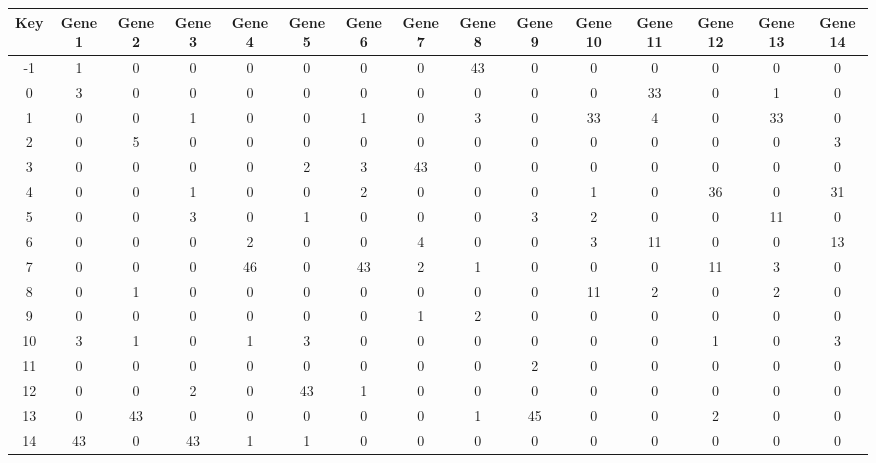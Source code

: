 \begin{tabular}{|c|c|c|c|c|c|c|c|c|c|c|c|c|c|c|}
\hline
Key & Gene 1 & Gene 2 & Gene 3 & Gene 4 & Gene 5 & Gene 6 & Gene 7 & Gene 8 & Gene 9 & Gene 10 & Gene 11 & Gene 12 & Gene 13 & Gene 14 \\
\hline
-1 & 1 & 0 & 0 & 0 & 0 & 0 & 0 & 43 & 0 & 0 & 0 & 0 & 0 & 0 \\
0 & 3 & 0 & 0 & 0 & 0 & 0 & 0 & 0 & 0 & 0 & 33 & 0 & 1 & 0 \\
1 & 0 & 0 & 1 & 0 & 0 & 1 & 0 & 3 & 0 & 33 & 4 & 0 & 33 & 0 \\
2 & 0 & 5 & 0 & 0 & 0 & 0 & 0 & 0 & 0 & 0 & 0 & 0 & 0 & 3 \\
3 & 0 & 0 & 0 & 0 & 2 & 3 & 43 & 0 & 0 & 0 & 0 & 0 & 0 & 0 \\
4 & 0 & 0 & 1 & 0 & 0 & 2 & 0 & 0 & 0 & 1 & 0 & 36 & 0 & 31 \\
5 & 0 & 0 & 3 & 0 & 1 & 0 & 0 & 0 & 3 & 2 & 0 & 0 & 11 & 0 \\
6 & 0 & 0 & 0 & 2 & 0 & 0 & 4 & 0 & 0 & 3 & 11 & 0 & 0 & 13 \\
7 & 0 & 0 & 0 & 46 & 0 & 43 & 2 & 1 & 0 & 0 & 0 & 11 & 3 & 0 \\
8 & 0 & 1 & 0 & 0 & 0 & 0 & 0 & 0 & 0 & 11 & 2 & 0 & 2 & 0 \\
9 & 0 & 0 & 0 & 0 & 0 & 0 & 1 & 2 & 0 & 0 & 0 & 0 & 0 & 0 \\
10 & 3 & 1 & 0 & 1 & 3 & 0 & 0 & 0 & 0 & 0 & 0 & 1 & 0 & 3 \\
11 & 0 & 0 & 0 & 0 & 0 & 0 & 0 & 0 & 2 & 0 & 0 & 0 & 0 & 0 \\
12 & 0 & 0 & 2 & 0 & 43 & 1 & 0 & 0 & 0 & 0 & 0 & 0 & 0 & 0 \\
13 & 0 & 43 & 0 & 0 & 0 & 0 & 0 & 1 & 45 & 0 & 0 & 2 & 0 & 0 \\
14 & 43 & 0 & 43 & 1 & 1 & 0 & 0 & 0 & 0 & 0 & 0 & 0 & 0 & 0 \\
\hline
\end{tabular}